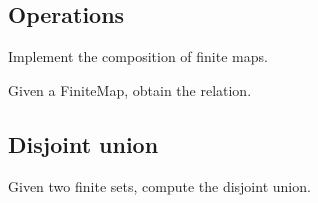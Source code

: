 \subsection{Operations}


\begin{gradedexercise}[Composition]
  Implement the composition of finite maps.


%

\end{gradedexercise}


\begin{gradedexercise}
  Given a FiniteMap, obtain the relation.


%

\end{gradedexercise}
\subsection{Disjoint union}
\begin{gradedexercise}
  Given two finite sets, compute the disjoint union.

\end{gradedexercise}

